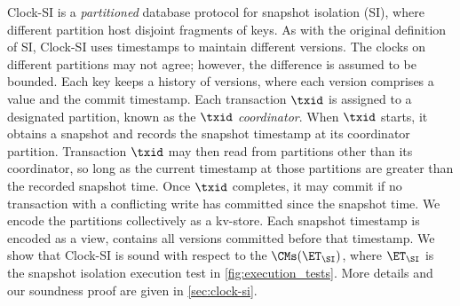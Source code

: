 Clock-SI is a \emph{partitioned} database protocol for snapshot isolation (SI),
where different partition host disjoint fragments of keys.
As with the original definition of SI, Clock-SI uses timestamps to maintain different versions. 
The clocks on different partitions may not agree; however, the difference is assumed to be bounded.
Each key keeps a history of versions, where each version comprises a value and the commit timestamp.
Each transaction $\txid$ is assigned to a designated partition, known as the $\txid$ \emph{coordinator}. 
When $\txid$ starts, it obtains a snapshot and records the snapshot timestamp at its coordinator partition.
Transaction $\txid$ may then read from partitions other than its coordinator, so long as the current timestamp at those partitions are greater than the recorded snapshot time. 
Once $\txid$ completes, it may commit if  no transaction with a conflicting write has committed since the snapshot time.
%
We encode the partitions collectively as a kv-store. 
Each snapshot timestamp is encoded as a view, contains all versions committed before that timestamp.
We show that Clock-SI is sound with respect to the $\CMs(\ET_\SI)$, 
where $\ET_\SI$ is the snapshot isolation execution test in \cref{fig:execution_tests}.
More details and our soundness proof are given in \cref{sec:clock-si}.
